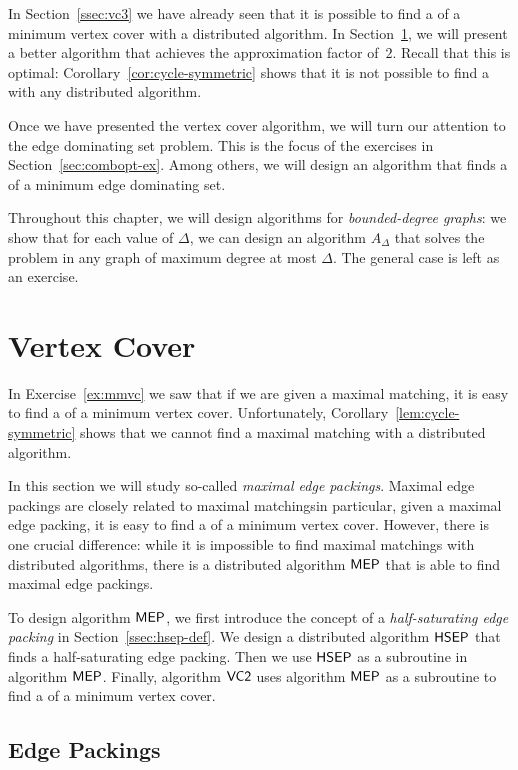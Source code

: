 In Section~\ref{ssec:vc3} we have already seen that it is possible to find a  of a minimum vertex cover with a distributed algorithm. In Section~\ref{sec:vc2}, we will present a better algorithm that achieves the approximation factor of~$2$. Recall that this is optimal: Corollary~\ref{cor:cycle-symmetric} shows that it is not possible to find a  with any distributed algorithm.

Once we have presented the vertex cover algorithm, we will turn our attention to the edge dominating set problem. This is the focus of the exercises in Section~\ref{sec:combopt-ex}. Among others, we will design an algorithm that finds a  of a minimum edge dominating set.

Throughout this chapter, we will design algorithms for \emph{bounded-degree graphs}: we show that for each value of $\Delta$, we can design an algorithm $A_\Delta$ that solves the problem in any graph of maximum degree at most $\Delta$. The general case is left as an exercise.


\section{Vertex Cover}\label{sec:vc2}

In Exercise~\ref{ex:mmvc} we saw that if we are given a maximal matching, it is easy to find a  of a minimum vertex cover. Unfortunately, Corollary~\ref{lem:cycle-symmetric} shows that we cannot find a maximal matching with a distributed algorithm.

In this section we will study so-called \emph{maximal edge packings}. Maximal edge packings are closely related to maximal matchings\mydash in particular, given a maximal edge packing, it is easy to find a  of a minimum vertex cover. However, there is one crucial difference: while it is impossible to find maximal matchings with distributed algorithms, there is a distributed algorithm $\textsf{MEP}$ that is able to find maximal edge packings.

To design algorithm $\textsf{MEP}$, we first introduce the concept of a \emph{half-saturating edge packing} in Section~\ref{ssec:hsep-def}. We design a distributed algorithm $\textsf{HSEP}$ that finds a half-saturating edge packing. Then we use $\textsf{HSEP}$ as a subroutine in algorithm $\textsf{MEP}$. Finally, algorithm $\textsf{VC2}$ uses algorithm $\textsf{MEP}$ as a subroutine to find a  of a minimum vertex cover.


\subsection{Edge Packings}

